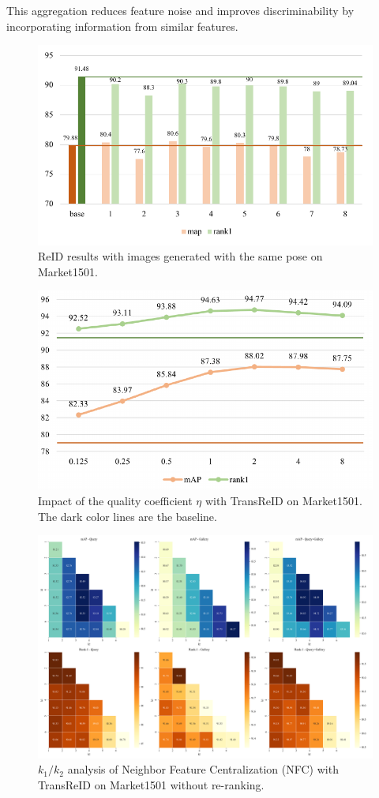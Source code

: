 This aggregation reduces feature noise and improves discriminability by incorporating information from similar features.

\begin{figure}
\centering
\includegraphics[width=\linewidth]{figs/pdf/samepose.pdf}
\caption{ReID results with images generated with the same pose on Market1501.}
\label{fig:samepose}
\end{figure}

\begin{figure}
\centering
\includegraphics[width=0.9\linewidth]{figs/pdf/eta.pdf}
\caption{Impact of the quality coefficient \( \eta \) with TransReID on Market1501. The dark color lines are the baseline.}
\label{fig:eta}
\end{figure}

\begin{figure}
\centering
\includegraphics[width=0.9\linewidth]{figs/k1k2.png}
\caption{$k_1/k_2$ analysis of Neighbor Feature Centralization (NFC) with TransReID on Market1501 without re-ranking.}
\label{fig:k1k2}
\end{figure}

